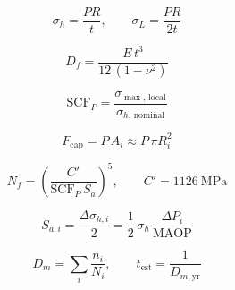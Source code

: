 
\begin{equation}
\sigma_{h} = \frac{P R}{t}, \qquad
\sigma_{L} = \frac{P R}{2 t}
\label{eq:thin_shell}
\end{equation}

\begin{equation}
D_{f} = \frac{E\,t^{3}}{12\,(1-\nu^{2})}
\label{eq:flexural_rigidity}
\end{equation}

\begin{equation}
\mathrm{SCF}_{P} = \frac{\sigma_{\max,\,\mathrm{local}}}{\sigma_{h,\,\mathrm{nominal}}}
\label{eq:scf_def}
\end{equation}

\begin{equation}
F_{\mathrm{cap}} = P\,A_{i} \approx P\,\pi R_{i}^{2}
\label{eq:end_cap}
\end{equation}

\begin{equation}
N_{f} = \left(\frac{C'}{\mathrm{SCF}_{P}\, S_{a}}\right)^{5},
\qquad C' = 1126~\mathrm{MPa}
\label{eq:markl}
\end{equation}

\begin{equation}
S_{a,i} = \frac{\Delta\sigma_{h,i}}{2}
= \frac{1}{2}\,\sigma_{h}\,\frac{\Delta P_{i}}{\mathrm{MAOP}}
\label{eq:samp}
\end{equation}

\begin{equation}
D_{m} = \sum_{i} \frac{n_{i}}{N_{i}},
\qquad
t_{\mathrm{est}} = \frac{1}{D_{m,\mathrm{yr}}}
\label{eq:miner}
\end{equation}

